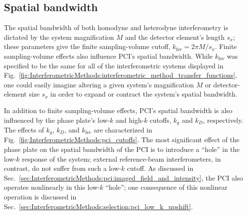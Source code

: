 \subsection{Spatial bandwidth}
The spatial bandwidth of both homodyne and heterodyne interferometry
is dictated by the system magnification $M$ and
the detector element's length $s_x$;
these parameters give the finite sampling-volume cutoff,
$k_{\text{fsv}} = 2 \pi M / s_x$.
Finite sampling-volume effects also influence PCI's spatial bandwidth.
While $k_{\text{fsv}}$ was specified to be the same
for all of the interferometric systems displayed in
Fig.~\ref{fig:InterferometricMethods:interferometric_method_transfer_functions},
one could easily imagine altering
a given system's magnification $M$ or detector-element size $s_x$
in order to expand or contract the system's spatial bandwidth.

In addition to finite sampling-volume effects,
PCI's spatial bandwidth is also influenced by
the phase plate's low-$k$ and high-$k$ cutoffs,
$k_g$ and $k_D$, respectively.
The effects of $k_g$, $k_D$, and $k_{\text{fsv}}$
are characterized in
Fig.~\ref{fig:InterferometricMethods:pci_cutoffs}.
The most significant effect of the phase plate
on the spatial bandwidth of the PCI
is to introduce a ``hole'' in the low-$k$ response of the system;
external reference-beam interferometers, in contrast,
do not suffer from such a low-$k$ cutoff.
As discussed in
Sec.~\ref{sec:InterferometricMethods:pci:imaged_field_and_intensity},
the PCI also operates nonlinearly in this low-$k$ ``hole'';
one consequence of this nonlinear operation is discussed in
Sec.~\ref{sec:InterferometricMethods:selection:pci_low_k_upshift}.

